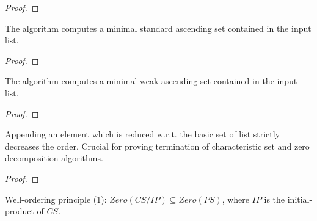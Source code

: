 \begin{proof}
    \leanok
\end{proof}

\begin{theorem}
    \label{inst:Standard.basicSet_minimal}
    \leanok
    The algorithm computes a minimal standard ascending set contained in the input list.
\end{theorem}

\begin{proof}
    \leanok
\end{proof}

\begin{theorem}
    \label{inst:Weak.basicSet_minimal}
    \leanok
    The algorithm computes a minimal weak ascending set contained in the input list.
\end{theorem}

\begin{proof}
    \leanok
\end{proof}

\begin{theorem}
    \label{thm:basicSet_append_lt_of_exists_reducedToSet}
    \leanok
    Appending an element which is reduced w.r.t. the basic set of list strictly decreases the order.
    Crucial for proving termination of characteristic set and zero decomposition algorithms.
\end{theorem}

\begin{proof}
    \leanok
\end{proof}

\begin{theorem}
    \label{thm:vanishingSet_diff_initialProd_subset}
    \leanok
    Well-ordering principle (1):
    $Zero(CS/IP) \subseteq Zero(PS)$, where $IP$ is the initial-product of $CS$.
\end{theorem}

